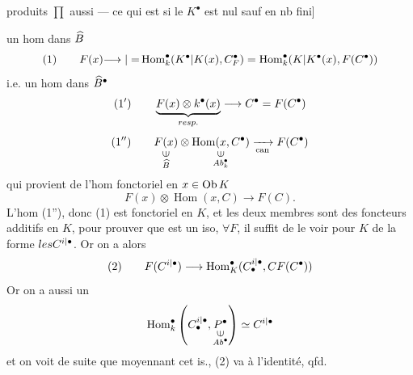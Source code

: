 produits $\prod$ aussi --- ce qui est  si le $K^\bullet$ est nul sauf en nb fini]


 un hom dans $\widehat{{B}}$
\[
(1)\qquad F(x){\longrightarrow|=}\operatorname{Hom}_{{k}}^\bullet({K^\bullet|K}(x),C_F^\bullet)
=\operatorname{Hom}_{{k}}^\bullet({K|K^\bullet}(x),F(C^\bullet))
\]
i.e. un hom dans $\widehat{{B}}^\bullet$
\[
(1')\qquad \underbrace{F(x)\otimes{k}^\bullet(x)}_{{resp.}}\longrightarrow C^\bullet=F(C^\bullet)
\]
\[
(1'')\qquad
\underset{\substack{\rotatebox{90}{$\in$}\\\widehat{\unsure{B}}}}{F(x)}
\otimes\underset{\substack{\rotatebox{90}{$\in$}\\Ab_{\unsure{k}}^\bullet}}{\operatorname{Hom}(x,C^\bullet)}
\xrightarrow[\mathrm{can}]{}F(C^\bullet)
\]
qui provient de l'hom fonctoriel en $x\in\operatorname{Ob}{K}$
\[
F(x)\otimes\operatorname{Hom}(x,C)\longrightarrow F(C).
\]
L'hom (1''), donc (1) est fonctoriel en $K$,
et les deux membres sont des foncteurs
additifs en $K$, pour prouver que 
est un iso, $\forall F$, il suffit de le voir
pour $K$ de la forme ${les} C^{{i|\bullet}}$. Or on a
alors
\[
(2)\qquad F(C^{{i|\bullet}})\longrightarrow\operatorname{Hom}_{K}^\bullet
(C_{{\bullet}}^{{i|\bullet}},{C}F(C^\bullet))
\]
Or on a aussi un
\[
\operatorname{Hom}_{\unsure{k}}^\bullet
\left(C_{\unsure{\bullet}}^{\unsure{i|\bullet}},\underset{\substack{\rotatebox{90}{$\in$}\\Ab^\bullet}}{P^\bullet}\right)
\simeq C^{\unsure{i|\bullet}}
\]
et on voit de suite que moyennant cet is.,
(2) va à l'identité, qfd.

